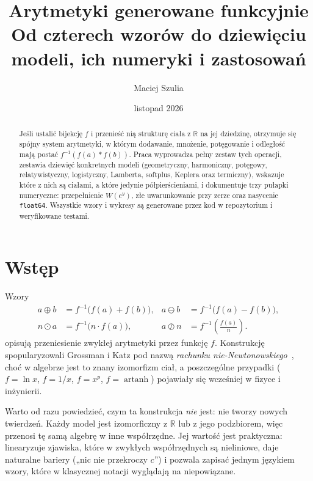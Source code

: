 \documentclass[11pt,a4paper]{article}
\title{\textbf{Arytmetyki generowane funkcyjnie}\\[2pt]
\large Od czterech wzorów do dziewięciu modeli, ich numeryki i zastosowań}
\author{Maciej Szulia}
\date{listopad 2026}
\newcommand{\ff}{f^{-1}}
\newcommand{\op}[1]{\mathbin{#1}}
\begin{document}
\maketitle

\begin{abstract}
\noindent
Jeśli ustalić bijekcję $f$ i przenieść nią strukturę ciała z $\mathbb{R}$ na jej
dziedzinę, otrzymuje się spójny system arytmetyki, w którym dodawanie, mnożenie,
potęgowanie i odległość mają postać $f^{-1}(f(a)\ast f(b))$. Praca wyprowadza
pełny zestaw tych operacji, zestawia dziewięć konkretnych modeli (geometryczny,
harmoniczny, potęgowy, relatywistyczny, logistyczny, Lamberta, softplus, Keplera
oraz termiczny), wskazuje które z nich są ciałami, a które jedynie
półpierścieniami, i dokumentuje trzy pułapki numeryczne: przepełnienie
$W(e^{y})$, złe uwarunkowanie przy zerze oraz nasycenie \texttt{float64}.
Wszystkie wzory i wykresy są generowane przez kod w repozytorium i weryfikowane
testami.
\end{abstract}

\section{Wstęp}

Wzory
\begin{equation}\label{eq:four}
\begin{aligned}
a\op{\oplus}b&=\ff\big(f(a)+f(b)\big), &
a\op{\ominus}b&=\ff\big(f(a)-f(b)\big),\\[2pt]
n\op{\odot}a&=\ff\big(n\cdot f(a)\big), &
a\op{\oslash}n&=\ff\!\left(\frac{f(a)}{n}\right).
\end{aligned}
\end{equation}
opisują przeniesienie zwykłej arytmetyki przez funkcję $f$. Konstrukcję
spopularyzowali Grossman i Katz pod nazwą \emph{rachunku
nie-Newtonowskiego}~\cite{grossman1972}, choć w algebrze jest to znany
izomorfizm ciał, a poszczególne przypadki ($f=\ln x$, $f=1/x$, $f=x^p$,
$f=\operatorname{artanh}$) pojawiały się wcześniej w fizyce i inżynierii.

Warto od razu powiedzieć, czym ta konstrukcja \emph{nie} jest: nie tworzy nowych
twierdzeń. Każdy model jest izomorficzny z $\mathbb{R}$ lub z jego podzbiorem,
więc przenosi tę samą algebrę w inne współrzędne. Jej wartość jest praktyczna:
linearyzuje zjawiska, które w zwykłych współrzędnych są nieliniowe, daje
naturalne bariery („nic nie przekroczy $c$”) i pozwala zapisać jednym językiem
wzory, które w klasycznej notacji wyglądają na niepowiązane.
\end{document}
